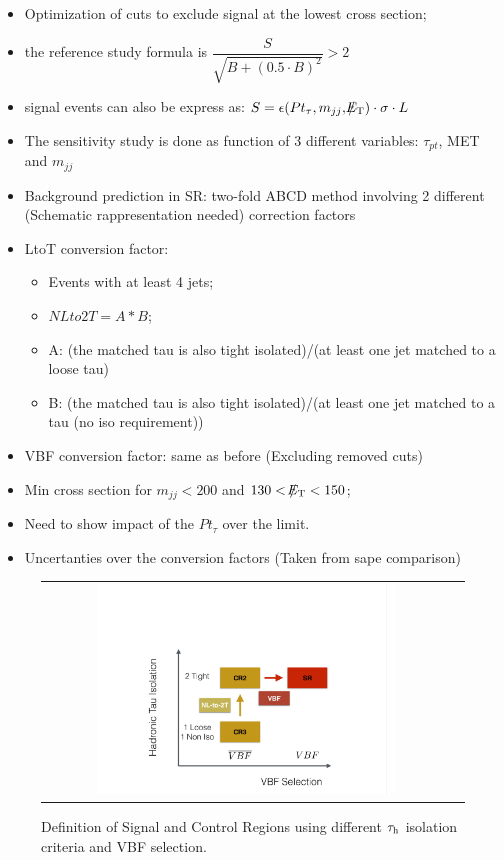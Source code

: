 \begin{itemize}
	\item Optimization of cuts to exclude signal at the lowest cross section;
	\item the reference study formula is $\dfrac{S}{\sqrt{B + (0.5 \cdot B)^{2}}} > 2$
	\item signal events can also be express as: $S = \epsilon ( Pt_{\tau} , m_{jj} ,  \slash\mkern-12mu{E}_{\text{T}} )\cdot \sigma \cdot L$
	\item The sensitivity study is done as function of 3 different variables: $\tau_{pt}$, MET and $m_{jj}$
	\item Background prediction in SR: two-fold ABCD method involving 2 different (Schematic rappresentation needed) correction factors
	\item LtoT conversion factor:
	\begin{itemize}
		\item Events with at least 4 jets;
		\item $NLto2T = A * B$;
		\item A: (the matched tau is also tight isolated)/(at least one jet matched to a loose tau)
		\item B: (the matched tau is also tight isolated)/(at least one jet matched to a tau (no iso requirement))
	\end{itemize}
		\item VBF conversion factor: same as before (Excluding removed cuts)
		\item Min cross section for $m_{jj} < 200$ and $130 < \slash\mkern-12mu{E}_{\text{T}} < 150$;
		\item Need to show impact of the $Pt_{\tau}$ over the limit.
		\item Uncertanties over the conversion factors (Taken from sape comparison)
\end{itemize}

\begin{figure}[tbh!]
	\centering
	\begin{tabular}{cc}
		\includegraphics[width=0.75\textwidth]{PLOTS/diTauHadLSotherPlots/controlregions13TeV.pdf}
	\end{tabular}
	\caption{Definition of Signal and Control Regions using different $\tau_{\text{h}}$ isolation criteria and VBF selection.}
	\label{fig:crs_13tev}
\end{figure}